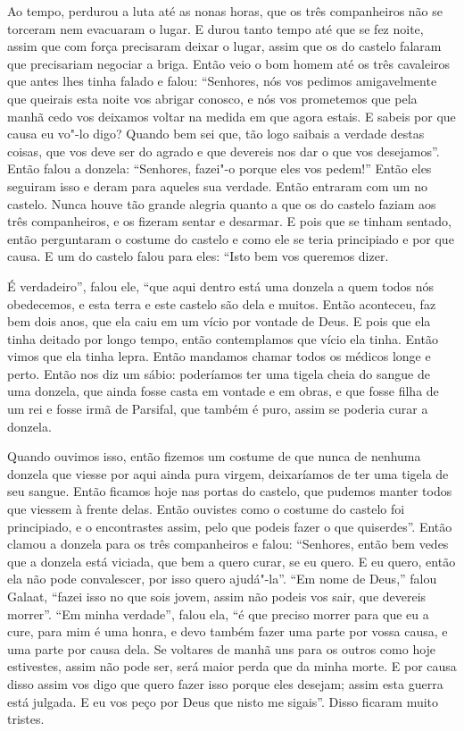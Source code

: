 Ao tempo, perdurou a luta até as nonas horas, que os três companheiros não se
torceram nem evacuaram o lugar. E durou tanto tempo até que se fez noite, assim
que com força precisaram deixar o lugar, assim que os do castelo falaram que
precisariam negociar a briga. Então veio o bom homem até os três cavaleiros que
antes lhes tinha falado e falou: “Senhores, nós vos pedimos amigavelmente que
queirais esta noite vos abrigar conosco, e nós vos prometemos que pela manhã
cedo vos deixamos voltar na medida em que agora estais. E sabeis por que causa
eu vo"-lo digo? Quando bem sei que, tão logo saibais a verdade destas coisas,
que vos deve ser do agrado e que devereis nos dar o que vos desejamos”. Então
falou a donzela: “Senhores, fazei"-o porque eles vos pedem!” Então eles
seguiram isso e deram para aqueles sua verdade. Então entraram com um no
castelo. Nunca houve tão grande alegria quanto a que os do castelo faziam aos
três companheiros, e os fizeram sentar e desarmar. E pois que se tinham
sentado, então perguntaram o costume do castelo e como ele se teria principiado
e por que causa. E um do castelo falou para eles: “Isto bem vos queremos
dizer.

É verdadeiro”, falou ele, “que aqui dentro está uma donzela a quem todos nós
obedecemos, e esta terra e este castelo são dela e muitos. Então aconteceu, faz
bem dois anos, que ela caiu em um vício por vontade de Deus. E pois que ela
tinha deitado por longo tempo, então contemplamos que vício ela tinha. Então
vimos que ela tinha lepra. Então mandamos chamar todos os médicos longe e
perto. Então nos diz um sábio: poderíamos ter uma tigela cheia do sangue de uma
donzela, que ainda fosse casta em vontade e em obras, e que fosse filha de um
rei e fosse irmã de Parsifal, que também é puro, assim se poderia curar a
donzela.

Quando ouvimos isso, então fizemos um costume de que nunca de nenhuma donzela
que viesse por aqui ainda pura virgem, deixaríamos de ter uma tigela de seu
sangue. Então ficamos hoje nas portas do castelo, que pudemos manter todos que
viessem à frente delas. Então ouvistes como o costume do castelo foi
principiado, e o encontrastes assim, pelo que podeis fazer o que quiserdes”.
Então clamou a donzela para os três companheiros e falou: “Senhores, então bem
vedes que a donzela está viciada, que bem a quero curar, se eu quero. E eu
quero, então ela não pode convalescer, por isso quero ajudá"-la”. “Em nome de
Deus,” falou Galaat, “fazei isso no que sois jovem, assim não podeis vos sair,
que devereis morrer”. “Em minha verdade”, falou ela, “é que preciso morrer para
que eu a cure, para mim é uma honra, e devo também fazer uma parte por vossa
causa, e uma parte por causa dela. Se voltares de manhã uns para os outros como
hoje estivestes, assim não pode ser, será maior perda que da minha morte. E por
causa disso assim vos digo que quero fazer isso porque eles desejam; assim esta
guerra está julgada. E eu vos peço por Deus que nisto me sigais”. Disso ficaram
muito tristes.

